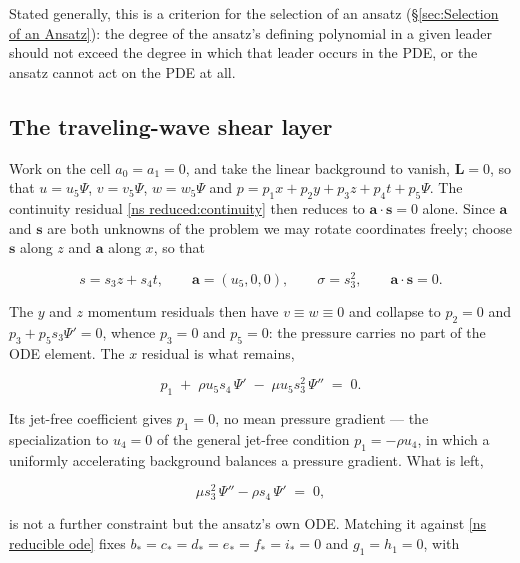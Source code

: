 \documentclass{article}
\theoremstyle{definition}
\theoremstyle{plain}
\begin{document}
\begin{nsexample}
Stated generally, this is a criterion for the selection of an ansatz
(\S\ref{sec:Selection of an Ansatz}): the degree of the ansatz's defining
polynomial in a given leader should not exceed the degree in which that leader
occurs in the PDE, or the ansatz cannot act on the PDE at all.

\subsection{The traveling-wave shear layer}
\label{ns shear layer}

Work on the cell $a_0 = a_1 = 0$, and take the linear background to vanish,
$\mathbf{L} = 0$, so that $u = u_5\Psi$, $v = v_5\Psi$, $w = w_5\Psi$ and
$p = p_1 x + p_2 y + p_3 z + p_4 t + p_5 \Psi$.  The continuity residual
\eqref{ns reduced:continuity} then reduces to $\mathbf{a}\cdot\mathbf{s} = 0$
alone.  Since $\mathbf{a}$ and $\mathbf{s}$ are both unknowns of the problem we
may rotate coordinates freely; choose $\mathbf{s}$ along $z$ and $\mathbf{a}$
along $x$, so that

\begin{equation*}
s = s_3 z + s_4 t, \qquad \mathbf{a} = (u_5,0,0), \qquad
\sigma = s_3^2, \qquad \mathbf{a}\cdot\mathbf{s} = 0 .
\end{equation*}

The $y$ and $z$ momentum residuals then have $v \equiv w \equiv 0$ and collapse
to $p_2 = 0$ and $p_3 + p_5 s_3 \Psi' = 0$, whence $p_3 = 0$ and $p_5 = 0$: the
pressure carries no part of the ODE element.  The $x$ residual is what remains,

\begin{equation}
\label{ns shear residual}
p_1 \;+\; \rho u_5 s_4\,\Psi' \;-\; \mu u_5 s_3^2\,\Psi'' \;=\; 0 .
\end{equation}

Its jet-free coefficient gives $p_1 = 0$, no mean pressure gradient --- the
specialization to $u_4 = 0$ of the general jet-free condition
$p_1 = -\rho u_4$, in which a uniformly accelerating background balances a
pressure gradient.  What is left,

\begin{equation}
\label{ns shear ode}
\mu s_3^2\,\Psi'' - \rho s_4\,\Psi' \;=\; 0 ,
\end{equation}

is not a further constraint but the ansatz's own ODE.  Matching it against
\eqref{ns reducible ode} fixes $b_* = c_* = d_* = e_* = f_* = i_* = 0$ and
$g_1 = h_1 = 0$, with


\end{nsexample}
\end{document}
